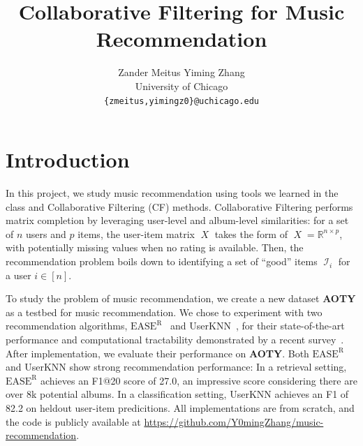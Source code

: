 \documentclass{article}
\title{Collaborative Filtering for Music Recommendation}
\author{
  Zander Meitus \qquad Yiming Zhang \\
  University of Chicago \\
  \texttt{\{zmeitus,yimingz0\}@uchicago.edu}
}
\newcommand{\aoty}{{\bf AOTY}\xspace}
\DeclareMathOperator{\X}{\mathit{X}}
\DeclareMathOperator{\I}{\mathcal{I}}
\newcommand{\easer}{$\text{EASE}^\text{R}$\xspace}
\newcommand{\userknn}{UserKNN\xspace}
\begin{document}
\maketitle

\section{Introduction}

In this project, we study music recommendation using tools we learned in the
 class and Collaborative Filtering (CF) methods.
Collaborative Filtering performs matrix completion by leveraging user-level and
 album-level similarities: for a set of $n$ users and $p$ items, the user-item
 matrix $\X$ takes the form of $\X = \mathbb{R}^{n \times p}$, with potentially
 missing values when no rating is available.
Then, the recommendation problem boils down to identifying a set of ``good''
 items $\I_i$ for a user $i \in [n]$.

To study the problem of music recommendation, we create a new dataset \aoty as
 a testbed for music recommendation.
We chose to experiment with two recommendation algorithms,
 \easer~\citep{steckEmbarrassinglyShallowAutoencoders2019} and
 \userknn~\citep{resnickGroupLensOpenArchitecture1994}, for their
 state-of-the-art performance and computational tractability demonstrated by a
 recent survey~\citep{anelliTopNRecommendationAlgorithms2022}.
After implementation, we evaluate their performance on \aoty.
Both \easer and \userknn show strong recommendation performance: In a retrieval
 setting, \easer achieves an F1@20 score of 27.0, an impressive score
 considering there are over 8k potential albums.
In a classification setting, \userknn achieves an F1 of 82.2 on heldout
 user-item predicitions.
All implementations are from scratch, and the code is publicly available at
 \url{https://github.com/Y0mingZhang/music-recommendation}.
\end{document}
